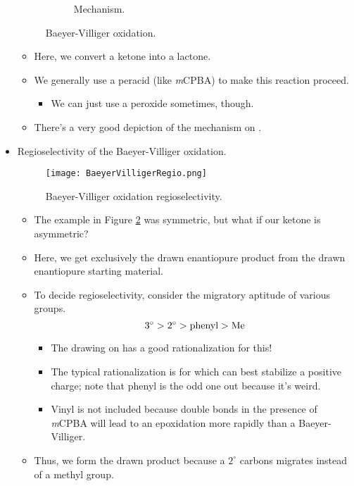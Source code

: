 \documentclass[../notes.tex]{subfiles}
\begin{document}
\begin{itemize}
\begin{figure}[h!]
\begin{subfigure}[b]{\linewidth}
            \caption{Mechanism.}
            \label{fig:BaeyerVilligerb}
        \end{subfigure}
        \caption{Baeyer-Villiger oxidation.}
        \label{fig:BaeyerVilliger}
    \end{figure}
    \begin{itemize}
        \item Here, we convert a ketone into a lactone.
        \item We generally use a peracid (like \emph{m}CPBA) to make this reaction proceed.
        \begin{itemize}
            \item We can just use a peroxide sometimes, though.
        \end{itemize}
        \item There's a very good depiction of the mechanism on \textcite[956]{bib:Clayden}.
    \end{itemize}
    \item Regioselectivity of the Baeyer-Villiger oxidation.
    \begin{figure}[h!]
        \centering
        \texttt{[image: BaeyerVilligerRegio.png]}
        \caption{Baeyer-Villiger oxidation regioselectivity.}
        \label{fig:BaeyerVilligerRegio}
    \end{figure}
    \begin{itemize}
        \item The example in Figure \ref{fig:BaeyerVilliger} was symmetric, but what if our ketone is asymmetric?
        \item Here, we get exclusively the drawn enantiopure product from the drawn enantiopure starting material.
        \item To decide regioselectivity, consider the migratory aptitude of various groups.
        \begin{equation*}
            3^\circ > 2^\circ > \text{phenyl} > \ce{Me}
        \end{equation*}
        \begin{itemize}
            \item The drawing on \textcite[956]{bib:Clayden} has a good rationalization for this!
            \item The typical rationalization is for which can best stabilize a positive charge; note that phenyl is the odd one out because it's weird.
            \item Vinyl is not included because double bonds in the presence of \emph{m}CPBA will lead to an epoxidation more rapidly than a Baeyer-Villiger.
        \end{itemize}
        \item Thus, we form the drawn product because a $2^\circ$ carbons migrates instead of a methyl group.
    \end{itemize}
\end{itemize}
\end{document}
